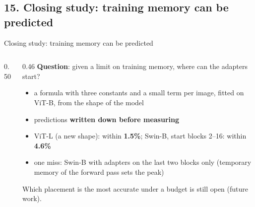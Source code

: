 \documentclass[aspectratio=169,11pt]{beamer}
\newcommand{\figWone}{6.4cm}
\begin{document}
\subsection{15. Closing study: training memory can be predicted}
\begin{frame}{Closing study: training memory can be predicted}
\begin{columns}[T]
\begin{column}{0.50\textwidth}
\renewcommand{\figWone}{6.2cm}
\centering
\end{column}
\begin{column}{0.46\textwidth}
\footnotesize
\textbf{Question}: given a limit on training memory, where can the adapters start?
\begin{itemize}
  \item a formula with three constants and a small term per image, fitted on ViT-B, from the shape of the model
  \item predictions \textbf{written down before measuring}
  \item ViT-L (a new shape): within \textbf{1.5\%}; Swin-B, start blocks 2--16: within \textbf{4.6\%}
  \item one miss: Swin-B with adapters on the last two blocks only (temporary memory of the forward pass sets the peak)
\end{itemize}
\medskip
Which placement is the most accurate under a budget is still open (future work).
\end{column}
\end{columns}
\end{frame}

\end{document}
